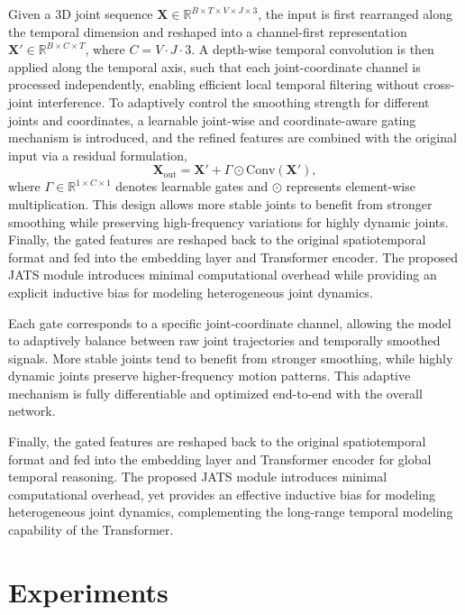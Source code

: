 \documentclass[conference]{IEEEtran}
\begin{document}
Given a 3D joint sequence $\mathbf{X} \in \mathbb{R}^{B \times T \times V \times J \times 3}$, the input is first rearranged along the temporal dimension and reshaped into a channel-first representation $\mathbf{X}' \in \mathbb{R}^{B \times C \times T}$, where $C = V \cdot J \cdot 3$. A depth-wise temporal convolution is then applied along the temporal axis, such that each joint-coordinate channel is processed independently, enabling efficient local temporal filtering without cross-joint interference. To adaptively control the smoothing strength for different joints and coordinates, a learnable joint-wise and coordinate-aware gating mechanism is introduced, and the refined features are combined with the original input via a residual formulation,
\begin{equation}
\mathbf{X}_{\text{out}} = \mathbf{X}' + \Gamma \odot \text{Conv}(\mathbf{X}'),
\end{equation}
where $\Gamma \in \mathbb{R}^{1 \times C \times 1}$ denotes learnable gates and $\odot$ represents element-wise multiplication. This design allows more stable joints to benefit from stronger smoothing while preserving high-frequency variations for highly dynamic joints. Finally, the gated features are reshaped back to the original spatiotemporal format and fed into the embedding layer and Transformer encoder. The proposed JATS module introduces minimal computational overhead while providing an explicit inductive bias for modeling heterogeneous joint dynamics.

Each gate corresponds to a specific joint-coordinate channel, allowing the model to adaptively balance between raw joint trajectories and temporally smoothed signals. More stable joints tend to benefit from stronger smoothing, while highly dynamic joints preserve higher-frequency motion patterns. This adaptive mechanism is fully differentiable and optimized end-to-end with the overall network.

Finally, the gated features are reshaped back to the original spatiotemporal format and fed into the embedding layer and Transformer encoder for global temporal reasoning. The proposed JATS module introduces minimal computational overhead, yet provides an effective inductive bias for modeling heterogeneous joint dynamics, complementing the long-range temporal modeling capability of the Transformer.





\section{Experiments}
\end{document}
